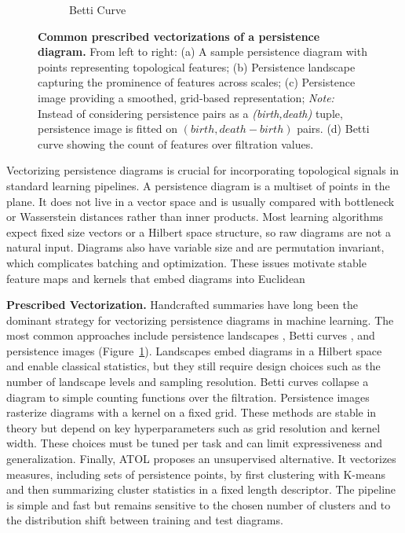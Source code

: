 \begin{figure}[t]
\begin{subfigure}[b]{0.23\textwidth}
        \caption{Betti Curve}
    \end{subfigure}
    \caption{\textbf{Common prescribed vectorizations of a persistence diagram.} From left to right: (a) A sample persistence diagram with points representing topological features; (b) Persistence landscape capturing the prominence of features across scales; (c) Persistence image providing a smoothed, grid-based representation; \textit{Note:} Instead of considering persistence pairs as a \textit{(birth,death)} tuple, persistence image is fitted on $(birth, death-birth)$ pairs. (d) Betti curve showing the count of features over filtration values.}
    \label{fig:ph-vectorizations}
\end{figure}

Vectorizing persistence diagrams is crucial for incorporating topological signals in standard learning pipelines. A persistence diagram is a multiset of points in the plane. It does not live in a vector space and is usually compared with bottleneck or Wasserstein distances rather than inner products. Most learning algorithms expect fixed size vectors or a Hilbert space structure, so raw diagrams are not a natural input. Diagrams also have variable size and are permutation invariant, which complicates batching and optimization. These issues motivate stable feature maps and kernels that embed diagrams into Euclidean 

\textbf{Prescribed Vectorization.} Handcrafted summaries have long been the dominant strategy for vectorizing persistence diagrams in machine learning. The most common approaches include persistence landscapes \cite{persistence_landscapes}, Betti curves \cite{betti_curves}, and persistence images \cite{persistence_images} (Figure~\ref{fig:ph-vectorizations}). Landscapes embed diagrams in a Hilbert space and enable classical statistics, but they still require design choices such as the number of landscape levels and sampling resolution. Betti curves collapse a diagram to simple counting functions over the filtration. Persistence images rasterize diagrams with a kernel on a fixed grid. These methods are stable in theory but depend on key hyperparameters such as grid resolution and kernel width. These choices must be tuned per task and can limit expressiveness and generalization. Finally, ATOL \cite{atol} proposes an unsupervised alternative. It vectorizes measures, including sets of persistence points, by first clustering with K-means and then summarizing cluster statistics in a fixed length descriptor. The pipeline is simple and fast but remains sensitive to the chosen number of clusters and to the distribution shift between training and test diagrams.

